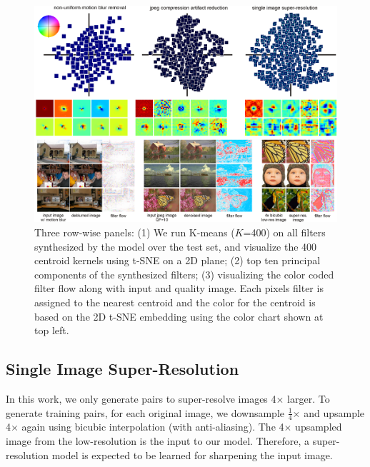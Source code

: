 \documentclass[10pt,twocolumn,letterpaper]{article}
\begin{document}
\begin{figure}[ht]
    \centering
    \begin{minipage}{0.995\textwidth}
        \centering
        \includegraphics[width=1\linewidth]{tSNE_visualization_v2.png}
        \captionsetup{width=0.999\textwidth}
    \end{minipage}
    \vspace{-3mm}
\caption{Three row-wise panels:
(1) We run K-means ($K$=400) on all filters synthesized by the model over the test set,
and visualize the 400 centroid kernels using t-SNE on a 2D plane;
(2) top ten principal components of the synthesized filters;
(3) visualizing the color coded filter flow along with input and quality
image. Each pixels filter is assigned to the nearest centroid and the color for the
centroid is based on the 2D t-SNE embedding using the color chart shown at top left.}
\label{fig:tSNE_filter_visualization}
\vspace{-1mm}
\end{figure}


\subsection{Single Image Super-Resolution}
In this work,
we only generate pairs to super-resolve images 4$\times$ larger.
To generate training pairs,
for each original image,
we downsample $\frac{1}{4}$$\times$ and upsample 4$\times$
again using bicubic interpolation (with anti-aliasing).
The 4$\times$ upsampled image from the low-resolution is the input to our model.
Therefore,
a super-resolution model is expected to be learned for sharpening the input image.
\end{document}
